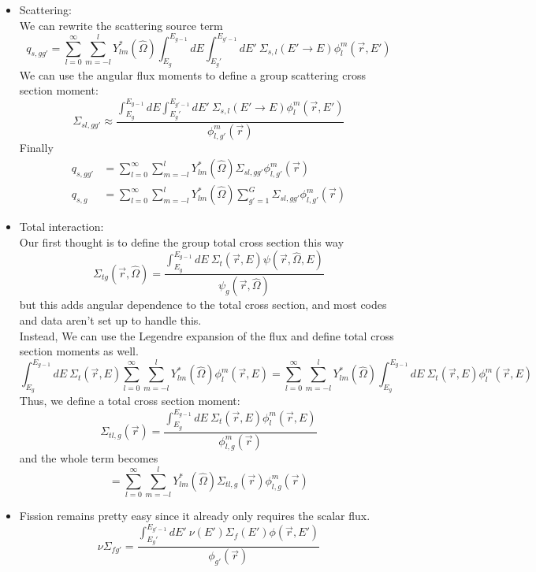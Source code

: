 \documentclass[12pt]{article}
\newcommand{\vOmega}{\ensuremath{\hat{\Omega}}}
\begin{document}
\begin{itemize}
\item Scattering:\\
We can rewrite the scattering source term
\[
q_{s,gg'} = \sum_{l=0}^{\infty} \sum_{m=-l}^l Y^*_{lm}(\vOmega)\int_{E_g}^{E_{g-1}} dE \int_{E_g'}^{E_{g'-1}} dE' \: \Sigma_{s,l}(E'\rightarrow E)\phi_{l}^{m}(\vec{r},E')
\]
We can use the angular flux moments to define a group scattering cross section moment:
\[
\Sigma_{sl,gg'} \approx \dfrac{\int_{E_g}^{E_{g-1}} dE \int_{E_g'}^{E_{g'-1}} dE' \: \Sigma_{s,l}(E'\rightarrow E)\phi_{l}^{m}(\vec{r},E')}{\phi_{l,g'}^{m}(\vec{r})}
\]
Finally
\begin{align*}
q_{s,gg'} &= \sum_{l=0}^{\infty} \sum_{m=-l}^l Y^*_{lm}(\vOmega)\Sigma_{sl,gg'}\phi_{l,g'}^{m}(\vec{r})\\
q_{s,g} &= \sum_{l=0}^{\infty} \sum_{m=-l}^l Y^*_{lm}(\vOmega)\sum_{g'=1}^G \Sigma_{sl,gg'}\phi_{l,g'}^{m}(\vec{r})
\end{align*}

\item Total interaction:\\
Our first thought is to define the group total cross section this way
\[
\Sigma_{tg}(\vec{r}, \vOmega) = \dfrac{\int_{E_g}^{E_{g-1}} dE\: \Sigma_t(\vec{r}, E) \psi(\vec{r}, \vOmega, E)}{\psi_g(\vec{r}, \vOmega)}
\]
but this adds angular dependence to the total cross section, and most codes and data aren't set up to handle this. \\
Instead, We can use the Legendre expansion of the flux and define total cross section moments as well.
\[
\int_{E_g}^{E_{g-1}} dE\: \Sigma_t(\vec{r}, E)\sum_{l=0}^{\infty} \sum_{m=-l}^l Y^*_{lm}(\vOmega)\phi_{l}^{m}(\vec{r},E) = \sum_{l=0}^{\infty} \sum_{m=-l}^l Y^*_{lm}(\vOmega)\int_{E_g}^{E_{g-1}} dE\: \Sigma_{t}(\vec{r},E)\phi_{l}^{m}(\vec{r},E)
\]
Thus, we define a total cross section moment:
\[
\Sigma_{tl,g}(\vec{r}) = \dfrac{\int_{E_g}^{E_{g-1}} dE\: \Sigma_t(\vec{r}, E) \phi_l^m(\vec{r}, E)}{\phi_{l,g}^m(\vec{r})}
\]
and the whole term becomes
\[
= \sum_{l=0}^{\infty} \sum_{m=-l}^l Y^*_{lm}(\vOmega)\Sigma_{tl,g}(\vec{r})\phi_{l,g}^{m}(\vec{r})
\]

\item Fission remains pretty easy since it already only requires the scalar flux. 
\[
\nu\Sigma_{fg'} = \dfrac{\int_{E_g'}^{E_{g'-1}} dE'\: \nu(E') \Sigma_f(E')\phi(\vec{r}, E')}{\phi_{g'}(\vec{r})}
\]
\end{itemize}
\end{document}
